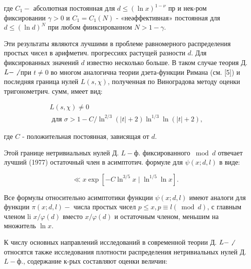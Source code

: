 \documentclass[10pt]{article}
\begin{document}
где $C_{1}-$ абсолютная постоянная для $d \leqslant(\ln x)^{1-\nu}$ пр и нек-ром фиксировании $\gamma>0$ и $C_{1}=C_{1}(N)$ - «неәффективная» постоянная для $d \leqslant(\ln d)^{N}$ при любом фииксированном $N>1-\gamma$.



Эти результаты являются лучшими в проблеме равномерного распределения простых чисел в арифметич. прогрессиях растущей разности $d$. Для фиксированных значений $d$ известно несколько больше. В таком случае теория Д. $L-\not$. при $t \neq 0$ во многом аналогична теории дзета-функции Римана (см. [5]) и последняя граница нулей $L(s, \chi)$, полученная по Виноградова методу оценки тригонометрич. сумм, имеет вид:



\[

\begin{gathered}

L(s, \chi) \neq 0 \\

\text { для } \sigma>1-C / \ln ^{2 / 3}(|t|+2) \ln ^{1 / 3} \ln (|t|+2),

\end{gathered}

\]



где $C$ - положительная постоянная, зависящая от $d$.



Этой границе нетривиальных нулей Д. $L-ф$. фиксированного $\bmod d$ отвечает лучший (1977) остаточный член в асимптотич. формуле для $\psi(x ; d, l)$ в виде:



\[

\ll x \exp \left[-C \ln ^{3 / 5} x \mid \ln ^{1 / 5} \ln x\right] \text {. }

\]



Все формулы относительно асимптотики функции $\psi(x ; d, l)$ имеют аналоги для функции $\pi(x ; d, l)-$ числа простых чисел $p \leqslant x, p \equiv l(\bmod d)$, с главным членом li $x / \varphi(d)$ вместо $x / \varphi(d)$ и остаточным членом, меньшим на множитель $\ln x$.



К числу основных направлений исследований в современной теории Д. $L-\not$. относятся также исследования плотности распределения нетривиальных нулей Д. $L-ф$., содержание к-рых составляют оценки величин:
\end{document}
